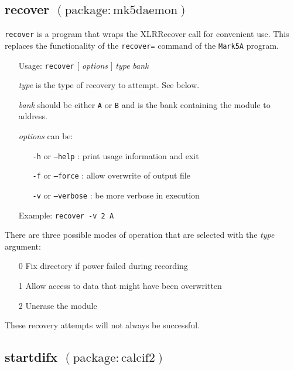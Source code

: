 
\subsection{recover {\small $\mathrm{(package: mk5daemon)}$}} \label{sec:recover}

{\tt recover} is a program that wraps the XLRRecover call for convenient use.
This replaces the functionality of the {\tt recover=} command of the {\tt Mark5A} program.

\begin{itemize}
\item[] Usage: {\tt recover} $[$ {\em options} $]$ {\em type} {\em bank}

\item[] {\em type} is the type of recovery to attempt.  See below.
\item[] {\em bank} should be either {\tt A} or {\tt B} and is the bank containing the module to address.
\item[] {\em options} can be:
\begin{itemize}
\item[] {\tt -h} or {\tt --help} : print usage information and exit
\item[] {\tt -f} or {\tt --force} : allow overwrite of output file
\item[] {\tt -v} or {\tt --verbose} : be more verbose in execution
\end{itemize}
\item[] Example: {\tt recover -v 2 A}
\end{itemize}

\noindent
There are three possible modes of operation that are selected with the {\em type} argument:
\begin{itemize}
\item[0] Fix directory if power failed during recording
\item[1] Allow access to data that might have been overwritten
\item[2] Unerase the module
\end{itemize}
These recovery attempts will not always be successful.






\subsection{startdifx {\small $\mathrm{(package: calcif2)}$}} \label{sec:startdifx} 

